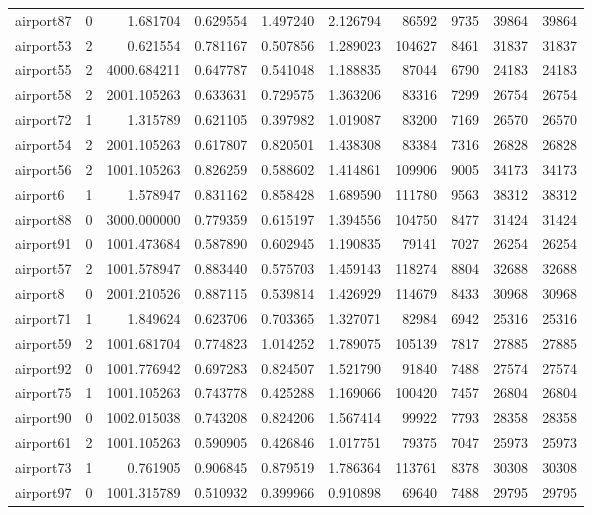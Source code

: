 \documentclass[../../../thesis.tex]{subfiles}
\begin{document}
\begin{longtable}{|l|r|r|r|r|r|r|r|r|r|}
airport87 & 0 & 1.681704 & 0.629554 & 1.497240 & 2.126794 & 86592 & 9735 & 39864 & 39864 \\
airport53 & 2 & 0.621554 & 0.781167 & 0.507856 & 1.289023 & 104627 & 8461 & 31837 & 31837 \\
airport55 & 2 & 4000.684211 & 0.647787 & 0.541048 & 1.188835 & 87044 & 6790 & 24183 & 24183 \\
airport58 & 2 & 2001.105263 & 0.633631 & 0.729575 & 1.363206 & 83316 & 7299 & 26754 & 26754 \\
airport72 & 1 & 1.315789 & 0.621105 & 0.397982 & 1.019087 & 83200 & 7169 & 26570 & 26570 \\
airport54 & 2 & 2001.105263 & 0.617807 & 0.820501 & 1.438308 & 83384 & 7316 & 26828 & 26828 \\
airport56 & 2 & 1001.105263 & 0.826259 & 0.588602 & 1.414861 & 109906 & 9005 & 34173 & 34173 \\
airport6 & 1 & 1.578947 & 0.831162 & 0.858428 & 1.689590 & 111780 & 9563 & 38312 & 38312 \\
airport88 & 0 & 3000.000000 & 0.779359 & 0.615197 & 1.394556 & 104750 & 8477 & 31424 & 31424 \\
airport91 & 0 & 1001.473684 & 0.587890 & 0.602945 & 1.190835 & 79141 & 7027 & 26254 & 26254 \\
airport57 & 2 & 1001.578947 & 0.883440 & 0.575703 & 1.459143 & 118274 & 8804 & 32688 & 32688 \\
airport8 & 0 & 2001.210526 & 0.887115 & 0.539814 & 1.426929 & 114679 & 8433 & 30968 & 30968 \\
airport71 & 1 & 1.849624 & 0.623706 & 0.703365 & 1.327071 & 82984 & 6942 & 25316 & 25316 \\
airport59 & 2 & 1001.681704 & 0.774823 & 1.014252 & 1.789075 & 105139 & 7817 & 27885 & 27885 \\
airport92 & 0 & 1001.776942 & 0.697283 & 0.824507 & 1.521790 & 91840 & 7488 & 27574 & 27574 \\
airport75 & 1 & 1001.105263 & 0.743778 & 0.425288 & 1.169066 & 100420 & 7457 & 26804 & 26804 \\
airport90 & 0 & 1002.015038 & 0.743208 & 0.824206 & 1.567414 & 99922 & 7793 & 28358 & 28358 \\
airport61 & 2 & 1001.105263 & 0.590905 & 0.426846 & 1.017751 & 79375 & 7047 & 25973 & 25973 \\
airport73 & 1 & 0.761905 & 0.906845 & 0.879519 & 1.786364 & 113761 & 8378 & 30308 & 30308 \\
airport97 & 0 & 1001.315789 & 0.510932 & 0.399966 & 0.910898 & 69640 & 7488 & 29795 & 29795 \\

\end{longtable}
\end{document}
